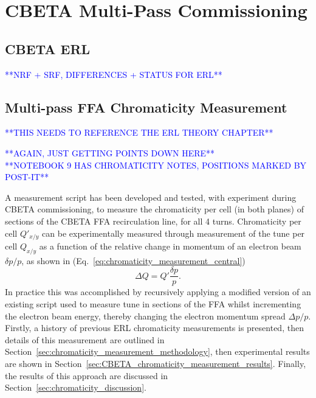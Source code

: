 \documentclass[../main.tex]{subfiles}
\begin{document}
\chapter{CBETA Multi-Pass Commissioning}
\label{CBETA_Multi-Pass_Commissioning} %

\section{CBETA ERL}

\textcolor{blue}{**NRF + SRF, DIFFERENCES + STATUS FOR ERL**}

\section{Multi-pass FFA Chromaticity Measurement}

\textcolor{blue}{**THIS NEEDS TO REFERENCE THE ERL THEORY CHAPTER**}

\textcolor{blue}{**AGAIN, JUST GETTING POINTS DOWN HERE** \\ **NOTEBOOK 9 HAS CHROMATICITY NOTES, POSITIONS MARKED BY POST-IT**}

A measurement script has been developed and tested, with experiment during CBETA commissioning, to measure the chromaticity per cell (in both planes) of sections of the CBETA FFA recirculation line, for all 4 turns. Chromaticity per cell $Q'_{x/y}$ can be experimentally measured through measurement of the tune per cell $Q_{x/y}$ as a function of the relative change in momentum of an electron beam $\delta p/p$, as shown in (Eq.~\ref{eq:chromaticity_measurement_central})
\begin{equation}
\Delta Q = Q'\frac{\delta p}{p}.
\label{eq:chromaticity_measurement_central}
\end{equation}
In practice this was accomplished by recursively applying a modified version of an existing script used to measure tune in sections of the FFA whilst incrementing the electron beam energy, thereby changing the electron momentum spread $\Delta p/p$. Firstly, a history of previous ERL chromaticity measurements is presented, then details of this measurement are outlined in Section~\ref{sec:chromaticity_measurement_methodology}, then experimental results are shown in Section~\ref{sec:CBETA_chromaticity_measurement_results}. Finally, the results of this approach are discussed in Section~\ref{sec:chromaticity_discussion}. 
\end{document}
